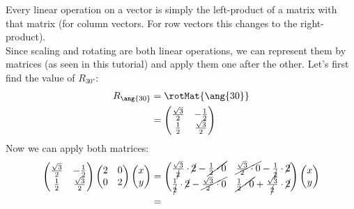 {\begin{enumerate}
{													\begin{answer}
														Every linear operation on a vector is simply the left-product of a matrix with that matrix (for column vectors. For row vectors this changes to the right-product).\\
														Since scaling and rotating are both linear operations, we can represent them by matrices (as seen in this tutorial) and apply them one after the other.
														Let's first find the value of $R_{\ang{30}}$:
														\begin{align*}
															R_{\ang{30}} &= \rotMat{\ang{30}}\\
															&= \begin{pmatrix} \frac{\sqrt{3}}{2} & -\frac{1}{2} \\ \frac{1}{2} & \frac{\sqrt{3}}{2} \\ \end{pmatrix}\\
														\end{align*}
														Now we can apply both matrices:
														\begin{align*}
															\begin{pmatrix} \frac{\sqrt{3}}{2} & -\frac{1}{2} \\ \frac{1}{2} & \frac{\sqrt{3}}{2} \end{pmatrix} \begin{pmatrix} 2 & 0 \\ 0 & 2 \end{pmatrix} \begin{pmatrix} x \\ y \end{pmatrix}
															&=
															\begin{pmatrix} \frac{\sqrt{3}}{\cancel{2}}\cdot\cancel{2}-\cancel{\frac{1}{2}\cdot0} & \cancel{\frac{\sqrt{3}}{2}\cdot0} - \frac{1}{\cancel{2}}\cdot\cancel{2} \\
																\frac{1}{\cancel{2}}\cdot\cancel{2} - \cancel{\frac{\sqrt{3}}{2}\cdot0} & \cancel{\frac{1}{2}\cdot0} + \frac{\sqrt{3}}{\cancel{2}}\cdot\cancel{2}\\
															\end{pmatrix}
															\begin{pmatrix}
																x \\
																y \\
															\end{pmatrix}\\
															&=

\end{align*}
\end{answer}}
\end{enumerate}}
